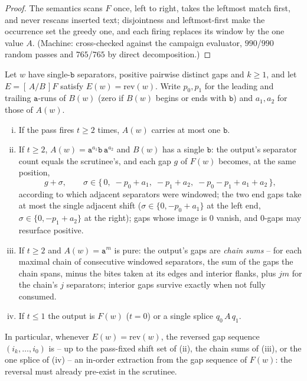 \begin{proof}
    The semantics scans $F$ once, left to right, takes the leftmost
    match first, and never rescans inserted text; disjointness and
    leftmost-first make the occurrence set the greedy one, and each
    firing replaces its window by the one value $A$.  (Machine:
    cross-checked against the campaign evaluator, $990$/$990$ random
    passes and $765$/$765$ by direct decomposition.)
\end{proof}

\begin{lemma}
    \label{dich:lem:FP}
    Let $w$ have single-$\mathtt b$ separators, positive pairwise
    distinct gaps and $k \ge 1$, and let $E = [\,A/B\,]F$ satisfy
    $E(w) = \mathrm{rev}(w)$.  Write $p_0, p_1$ for the leading and
    trailing $\mathtt a$-runs of $B(w)$ (zero if $B(w)$ begins or ends
    with $\mathtt b$) and $a_1, a_2$ for those of $A(w)$.
    \begin{enumerate}[(i)]
        \item If the pass fires $t \ge 2$ times, $A(w)$ carries at
        most one $\mathtt b$.
        \item If $t \ge 2$, $A(w) = \mathtt a^{a_1}\mathtt b\,
        \mathtt a^{a_2}$ and $B(w)$ has a single $\mathtt b$: the
        output's separator count equals the scrutinee's, and each gap
        $g$ of $F(w)$ becomes, at the same position,
        \begin{equation*}
            g + \sigma, \qquad
            \sigma \in \{\,0,\; -p_0 + a_1,\; -p_1 + a_2,\;
            -p_0 - p_1 + a_1 + a_2\,\},
        \end{equation*}
        according to which adjacent separators were windowed; the two
        end gaps take at most the single adjacent shift
        ($\sigma \in \{0, -p_0 + a_1\}$ at the left end, $\sigma \in
        \{0, -p_1 + a_2\}$ at the right); gaps whose image is $0$
        vanish, and $0$-gaps may resurface positive.
        \item If $t \ge 2$ and $A(w) = \mathtt a^{m}$ is pure: the
        output's gaps are \emph{chain sums} -- for each maximal chain
        of consecutive windowed separators, the sum of the gaps the
        chain spans, minus the bites taken at its edges and interior
        flanks, plus $jm$ for the chain's $j$ separators; interior gaps
        survive exactly when not fully consumed.
        \item If $t \le 1$ the output is $F(w)$ ($t = 0$) or a single
        splice $q_0\,A\,q_1$.
    \end{enumerate}
    In particular, whenever $E(w) = \mathrm{rev}(w)$, the reversed gap
    sequence $(i_k, \ldots, i_0)$ is -- up to the pass-fixed shift set
    of (ii), the chain sums of (iii), or the one splice of (iv) -- an
    in-order extraction from the gap sequence of $F(w)$: the reversal
    must already pre-exist in the scrutinee.
\end{lemma}


